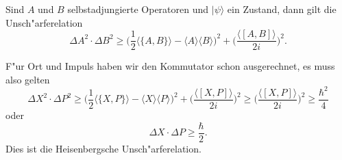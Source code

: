 \begin{satz}
\label{skript:robertson-schroedinger-unschaerfe}
Sind $A$ und $B$ selbstadjungierte Operatoren und $|\psi\rangle$ ein
Zustand, dann gilt die Unsch"arferelation
\begin{equation}
\Delta A^2\cdot\Delta B^2\ge 
\biggl(
\frac12\langle \{A,B\}\rangle - \langle A\rangle\langle B\rangle
\biggr)^2
+
\biggl(
\frac{\langle[A,B]\rangle}{2i}
\biggr)^2.
\label{skript:uncertainty}
\end{equation}
\end{satz}

F"ur Ort und Impuls haben wir den Kommutator schon ausgerechnet, es
muss also gelten
\begin{equation}
\Delta X^2\cdot \Delta P^2
\ge
\biggl(
\frac12\langle \{X,P\}\rangle - \langle X\rangle\langle P\rangle
\biggr)^2
+
\biggl(
\frac{\langle[X,P]\rangle}{2i}
\biggr)^2
\ge
\biggl(
\frac{\langle[X,P]\rangle}{2i}
\biggr)^2
\ge \frac{\hbar^2}4
\end{equation}
oder
\begin{equation}
\Delta X\cdot\Delta P\ge \frac{\hbar}2.
\end{equation}
Dies ist die Heisenbergsche Unsch"arferelation. 

